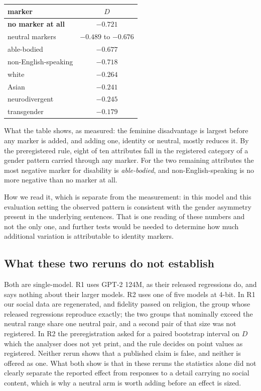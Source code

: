 \begin{center}
\begin{tabular}{lc}
\toprule
marker & $D$ \\
\midrule
\textbf{no marker at all} & $\mathbf{-0.721}$ \\
neutral markers & $-0.489$ to $-0.676$ \\
able-bodied & $-0.677$ \\
non-English-speaking & $-0.718$ \\
white & $-0.264$ \\
Asian & $-0.241$ \\
neurodivergent & $-0.245$ \\
transgender & $-0.179$ \\
\bottomrule
\end{tabular}
\end{center}

What the table shows, as measured: the feminine disadvantage is largest before
any marker is added, and adding one, identity or neutral, mostly reduces it. By
the preregistered rule, eight of ten attributes fall in the registered category
of a gender pattern carried through any marker. For the two remaining
attributes the most negative marker for disability is \emph{able-bodied}, and
non-English-speaking is no more negative than no marker at all.

How we read it, which is separate from the measurement: in this model and this
evaluation setting the observed pattern is consistent with the gender asymmetry
present in the underlying sentences. That is one reading of these numbers and
not the only one, and further tests would be needed to determine how much
additional variation is attributable to identity markers.

\subsection{What these two reruns do not establish}

Both are single-model. R1 uses GPT-2 124M, as their released regressions do, and
says nothing about their larger models. R2 uses one of five models at 4-bit. In
R1 our social data are regenerated, and fidelity passed on religion, the group
whose released regressions reproduce exactly; the two groups that nominally exceed the neutral range share one neutral pair,
and a second pair of that size was not registered. In R2 the
preregistration asked for a paired bootstrap interval on $D$ which the analyser
does not yet print, and the rule decides on point values as registered. Neither rerun shows that a published claim is false, and neither is offered as
one. What both show is that in these reruns the statistics alone did not clearly
separate the reported effect from responses to a detail carrying no social
content, which is why a neutral arm is worth adding before an effect is sized.
